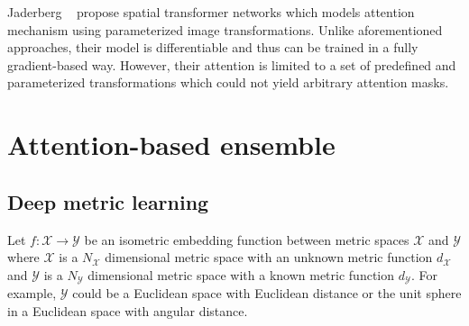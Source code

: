\documentclass[runningheads]{llncs}
\begin{document}
Jaderberg \etal~\cite{jaderberg2015spatial} propose spatial transformer networks which models attention mechanism using parameterized image transformations.
Unlike aforementioned approaches, their model is differentiable and thus can be trained in a fully gradient-based way.
However, their attention is limited to a set of predefined and parameterized transformations which could not yield arbitrary attention masks.



 
\vspace{-4mm}
\section{Attention-based ensemble}
\label{sec:proposed}
\vspace{-2mm}
\subsection{Deep metric learning}
\vspace{-2mm}

Let $f:\mathcal{X} \rightarrow \mathcal{Y}$ be an isometric embedding function
 between metric spaces $\mathcal{X} $ and $\mathcal{Y}$
 where $\mathcal{X} $ is a $N_\mathcal{X}  $ dimensional metric space with an unknown metric function $d_\mathcal{X} $ and
 $\mathcal{Y}$ is a $N_\mathcal{Y}$ dimensional metric space with a known metric function $d_\mathcal{Y} $.
For example, $\mathcal{Y}$ could be a Euclidean space with Euclidean distance or the unit sphere in a Euclidean space with angular distance.
\end{document}
